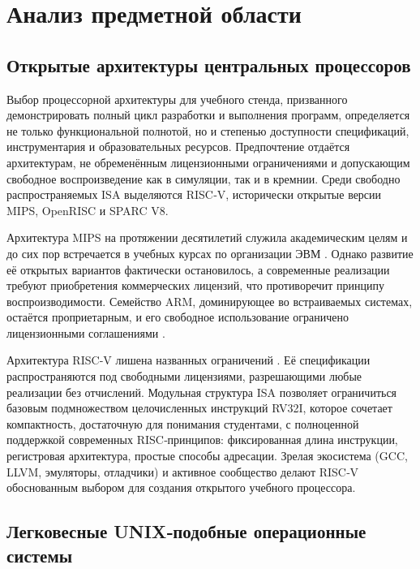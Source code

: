 

\section{Анализ предметной области}
\label{sec:relatedworks}

\subsection{Открытые архитектуры центральных процессоров}

Выбор процессорной архитектуры для учебного стенда, призванного демонстрировать полный цикл разработки и выполнения программ, определяется не только функциональной полнотой, но и степенью доступности спецификаций, инструментария и образовательных ресурсов. Предпочтение отдаётся архитектурам, не обременённым лицензионными ограничениями и допускающим свободное воспроизведение как в симуляции, так и в кремнии. Среди свободно распространяемых ISA выделяются RISC‑V, исторически открытые версии MIPS, OpenRISC и SPARC V8.

Архитектура MIPS на протяжении десятилетий служила академическим целям и до сих пор встречается в учебных курсах по организации ЭВМ \cite{MIPS}. Однако развитие её открытых вариантов фактически остановилось, а современные реализации требуют приобретения коммерческих лицензий, что противоречит принципу воспроизводимости. Семейство ARM, доминирующее во встраиваемых системах, остаётся проприетарным, и его свободное использование ограничено лицензионными соглашениями \cite{ARM}.

Архитектура RISC‑V лишена названных ограничений \cite{RISCV}. Её спецификации распространяются под свободными лицензиями, разрешающими любые реализации без отчислений. Модульная структура ISA позволяет ограничиться базовым подмножеством целочисленных инструкций RV32I, которое сочетает компактность, достаточную для понимания студентами, с полноценной поддержкой современных RISC‑принципов: фиксированная длина инструкции, регистровая архитектура, простые способы адресации. Зрелая экосистема (GCC, LLVM, эмуляторы, отладчики) и активное сообщество делают RISC‑V обоснованным выбором для создания открытого учебного процессора.

\subsection{Легковесные UNIX‑подобные операционные системы}

